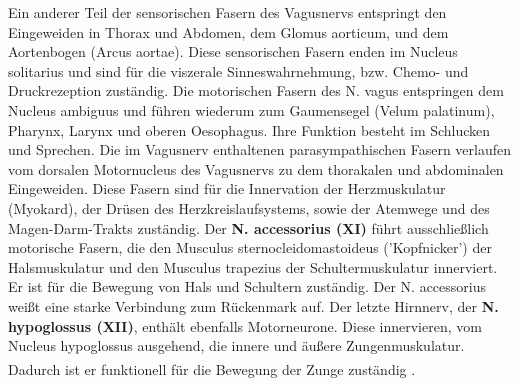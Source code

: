 \documentclass[12pt,a4paper,pdftex]{article}
\begin{document}
Ein anderer Teil der sensorischen Fasern des Vagusnervs entspringt den Eingeweiden in Thorax und Abdomen, dem Glomus aorticum, und dem Aortenbogen (Arcus aortae). Diese sensorischen Fasern enden im Nucleus solitarius und sind für die viszerale Sinneswahrnehmung, bzw. Chemo- und Druckrezeption zuständig. Die motorischen Fasern des N. vagus entspringen dem Nucleus ambiguus und führen wiederum zum Gaumensegel (Velum palatinum), Pharynx, Larynx und oberen Oesophagus. Ihre Funktion besteht im Schlucken und Sprechen. Die im Vagusnerv enthaltenen parasympathischen Fasern verlaufen vom dorsalen Motornucleus des Vagusnervs zu dem thorakalen und abdominalen Eingeweiden. Diese Fasern sind für die Innervation der Herzmuskulatur (Myokard), der Drüsen des Herzkreislaufsystems, sowie der Atemwege und des Magen-Darm-Trakts zuständig. Der \textbf{N. accessorius (XI)} führt ausschließlich motorische Fasern, die den Musculus sternocleidomastoideus ('Kopfnicker') der Halsmuskulatur und den Musculus trapezius der Schultermuskulatur innerviert. Er ist für die Bewegung von Hals und Schultern zuständig. Der N. accessorius weißt eine starke Verbindung zum Rückenmark auf. Der letzte Hirnnerv, der \textbf{N. hypoglossus (XII)}, enthält ebenfalls Motorneurone. Diese innervieren, vom Nucleus hypoglossus ausgehend, die innere und äußere Zungenmuskulatur. Dadurch ist er funktionell für die Bewegung der Zunge zuständig \textsuperscript{\cite[10]{crossman2014neuroanatomy}}.
\end{document}
